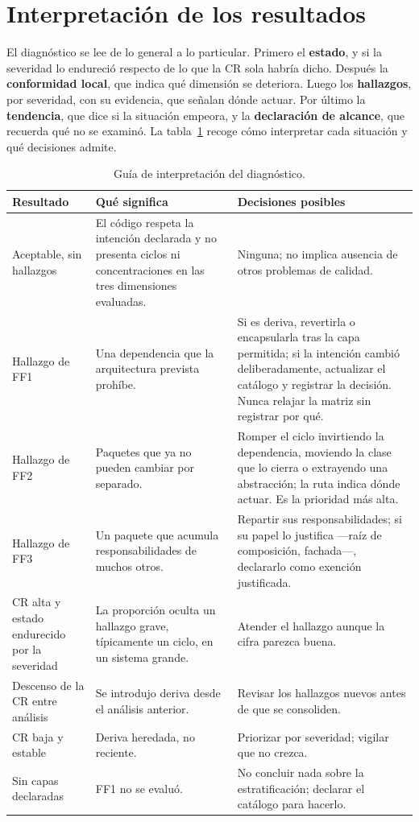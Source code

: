 \section{Interpretación de los resultados}
\label{sec:interpretacion}
El diagnóstico se lee de lo general a lo particular. Primero el \textbf{estado}, y si la severidad lo endureció respecto de lo que la CR sola habría dicho. Después la \textbf{conformidad local}, que indica qué dimensión se deteriora. Luego los \textbf{hallazgos}, por severidad, con su evidencia, que señalan dónde actuar. Por último la \textbf{tendencia}, que dice si la situación empeora, y la \textbf{declaración de alcance}, que recuerda qué no se examinó. La tabla~\ref{tab:interpretacion} recoge cómo interpretar cada situación y qué decisiones admite.

\begin{table}[tbp]
\centering
\caption{Guía de interpretación del diagnóstico.}
\label{tab:interpretacion}
\footnotesize
\begin{tabularx}{\textwidth}{>{\raggedright\arraybackslash}p{3.4cm}XX}
\toprule
\textbf{Resultado} & \textbf{Qué significa} & \textbf{Decisiones posibles} \\
\midrule
Aceptable, sin hallazgos & El código respeta la intención declarada y no presenta ciclos ni concentraciones en las tres dimensiones evaluadas. & Ninguna; no implica ausencia de otros problemas de calidad. \\
\midrule
Hallazgo de FF1 & Una dependencia que la arquitectura prevista prohíbe. & Si es deriva, revertirla o encapsularla tras la capa permitida; si la intención cambió deliberadamente, actualizar el catálogo y registrar la decisión. Nunca relajar la matriz sin registrar por qué. \\
\midrule
Hallazgo de FF2 & Paquetes que ya no pueden cambiar por separado. & Romper el ciclo invirtiendo la dependencia, moviendo la clase que lo cierra o extrayendo una abstracción; la ruta indica dónde actuar. Es la prioridad más alta. \\
\midrule
Hallazgo de FF3 & Un paquete que acumula responsabilidades de muchos otros. & Repartir sus responsabilidades; si su papel lo justifica ---raíz de composición, fachada---, declararlo como exención justificada. \\
\midrule
CR alta y estado endurecido por la severidad & La proporción oculta un hallazgo grave, típicamente un ciclo, en un sistema grande. & Atender el hallazgo aunque la cifra parezca buena. \\
\midrule
Descenso de la CR entre análisis & Se introdujo deriva desde el análisis anterior. & Revisar los hallazgos nuevos antes de que se consoliden. \\
\midrule
CR baja y estable & Deriva heredada, no reciente. & Priorizar por severidad; vigilar que no crezca. \\
\midrule
Sin capas declaradas & FF1 no se evaluó. & No concluir nada sobre la estratificación; declarar el catálogo para hacerlo. \\
\bottomrule
\end{tabularx}
\end{table}

